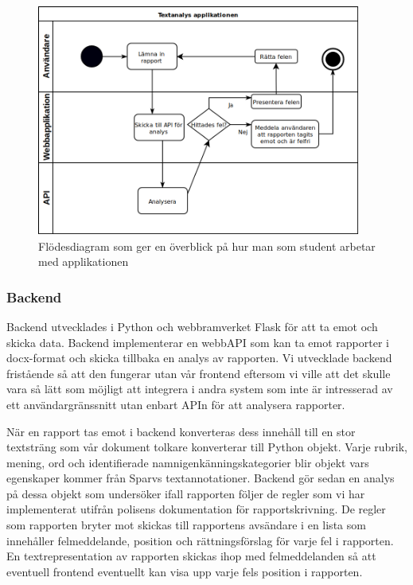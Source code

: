 \documentclass[swedish]{maucsthesis}
\begin{document}
\begin{figure}[H]
    \centering
    \includegraphics[width=0.95\textwidth]{overviewflow.png}
    \caption{Flödesdiagram som ger en överblick på hur man som student arbetar med applikationen}
    \label{fig:overviewflow}
\end{figure}

\subsubsection{Backend}

Backend utvecklades i Python och webbramverket Flask för att ta emot och skicka
data. Backend implementerar en webbAPI som kan ta emot rapporter i docx-format
och skicka tillbaka en analys av rapporten. Vi utvecklade backend
fristående så att den fungerar utan vår frontend eftersom vi ville att det
skulle vara så lätt som möjligt att integrera i andra system som inte är
intresserad av ett användargränssnitt utan enbart APIn för att analysera
rapporter.

När en rapport tas emot i backend konverteras dess innehåll till en stor
textsträng som vår dokument tolkare konverterar till Python objekt. Varje
rubrik, mening, ord och identifierade namnigenkänningskategorier blir objekt
vars egenskaper kommer från Sparvs textannotationer. Backend gör sedan en analys
på dessa objekt som undersöker ifall rapporten följer de regler som vi har
implementerat utifrån polisens dokumentation för rapportskrivning. De regler som
rapporten bryter mot skickas till rapportens avsändare i en lista som innehåller
felmeddelande, position och rättningsförslag för varje fel i rapporten. En
textrepresentation av rapporten skickas ihop med felmeddelanden så att eventuell
frontend eventuellt kan visa upp varje fels position i rapporten.
\end{document}
